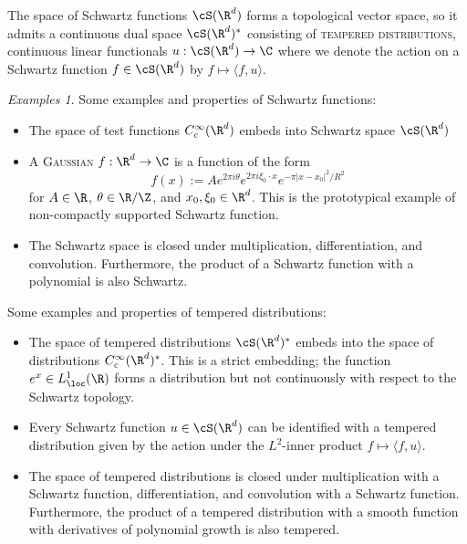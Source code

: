 \documentclass[reqno]{amsart}
\theoremstyle{definition}
\theoremstyle{remark}
\newtheorem*{examples}{Examples}
\renewcommand{\emph}{\textsc}
\begin{document}
The space of Schwartz functions $\cS (\R^d)$ forms a topological vector space, so it admits a continuous dual space $\cS (\R^d)^*$ consisting of \emph{tempered distributions}, continuous linear functionals $u : \cS (\R^d) \to \C$ where we denote the action on a Schwartz function $f \in \cS (\R^d)$ by $f \mapsto \langle f , u \rangle$. 

\begin{examples}
Some examples and properties of Schwartz functions:
\begin{itemize}
	\item The space of test functions $C^\infty_c (\R^d)$ embeds into Schwartz space $\cS (\R^d)$
	
	\item A \emph{Gaussian} $f: \R^d \to \C$ is a function of the form 
			\[ f(x) := A e^{2\pi i \theta} e^{2\pi i \xi_0 \cdot x} e^{- \pi |x - x_0|^2/ R^2} \]
		for $A \in \R$, $\theta \in \R/\Z$, and $x_0, \xi_0 \in \R^d$. This is the prototypical example of non-compactly supported Schwartz function. 
	
	\item The Schwartz space is closed under multiplication, differentiation, and convolution. Furthermore, the product of a Schwartz function with a polynomial is also Schwartz. 
	
\end{itemize}	
Some examples and properties of tempered distributions:
\begin{itemize} 
	\item The space of tempered distributions $\cS (\R^d)^*$ embeds into the space of distributions $C^\infty_c (\R^d)^*$. This is a strict embedding; the function $e^x \in L^1_{\loc} (\R)$ forms a distribution but not continuously with respect to the Schwartz topology. 

	\item Every Schwartz function $u \in \cS (\R^d)$ can be identified with a tempered distribution given by the action under the $L^2$-inner product $f \mapsto \langle f, u \rangle$. 
	
	\item The space of tempered distributions is closed under multiplication with a Schwartz function, differentiation, and convolution with a Schwartz function. Furthermore, the product of a tempered distribution with a smooth function with derivatives of polynomial growth is also tempered. 
\end{itemize}	
\end{examples}
\end{document}
